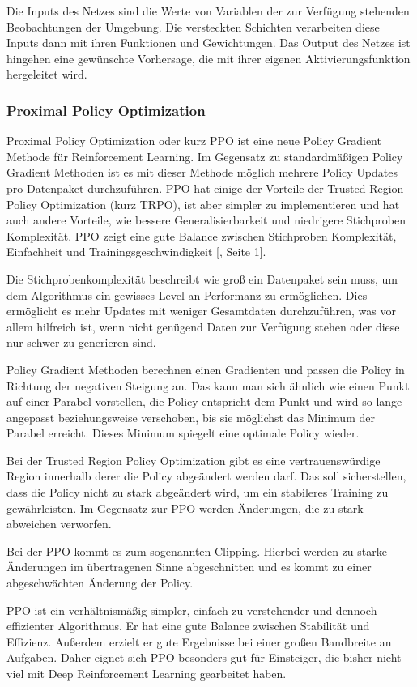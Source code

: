 Die Inputs des Netzes sind die Werte von Variablen der zur Verfügung stehenden Beobachtungen der Umgebung. Die versteckten Schichten verarbeiten diese Inputs dann mit ihren Funktionen und Gewichtungen. Das Output des Netzes ist hingehen eine gewünschte Vorhersage, die mit ihrer eigenen Aktivierungsfunktion hergeleitet wird.
\subsubsection{Proximal Policy Optimization}
Proximal Policy Optimization oder kurz PPO ist eine neue Policy Gradient Methode für Reinforcement Learning. Im Gegensatz zu standardmäßigen Policy Gradient Methoden ist es mit dieser Methode möglich mehrere Policy Updates pro Datenpaket durchzuführen. PPO hat einige der Vorteile der Trusted Region Policy Optimization (kurz TRPO), ist aber simpler zu implementieren und hat auch andere Vorteile, wie bessere Generalisierbarkeit und niedrigere Stichproben Komplexität. PPO zeigt eine gute Balance zwischen Stichproben Komplexität, Einfachheit und Trainingsgeschwindigkeit [\cite{schulman_proximal_2017}, Seite 1].

Die Stichprobenkomplexität beschreibt wie groß ein Datenpaket sein muss, um dem Algorithmus ein gewisses Level an Performanz zu ermöglichen. Dies ermöglicht es mehr Updates mit weniger Gesamtdaten durchzuführen, was vor allem hilfreich ist, wenn nicht genügend Daten zur Verfügung stehen oder diese nur schwer zu generieren sind.

Policy Gradient Methoden berechnen einen Gradienten und passen die Policy in Richtung der negativen Steigung an. Das kann man sich ähnlich wie einen Punkt auf einer Parabel vorstellen, die Policy entspricht dem Punkt und wird so lange angepasst beziehungsweise verschoben, bis sie möglichst das Minimum der Parabel erreicht. Dieses Minimum spiegelt eine optimale Policy wieder.

Bei der Trusted Region Policy Optimization gibt es eine vertrauenswürdige Region innerhalb derer die Policy abgeändert werden darf. Das soll sicherstellen, dass die Policy nicht zu stark abgeändert wird, um ein stabileres Training zu gewährleisten. Im Gegensatz zur PPO werden Änderungen, die zu stark abweichen verworfen.

Bei der PPO kommt es zum sogenannten Clipping. Hierbei werden zu starke Änderungen im übertragenen Sinne abgeschnitten und es kommt zu einer abgeschwächten Änderung der Policy.

PPO ist ein verhältnismäßig simpler, einfach zu verstehender und dennoch effizienter Algorithmus. Er hat eine gute Balance zwischen Stabilität und Effizienz. Außerdem erzielt er gute Ergebnisse bei einer großen Bandbreite an Aufgaben. Daher eignet sich PPO besonders gut für Einsteiger, die bisher nicht viel mit Deep Reinforcement Learning gearbeitet haben.
